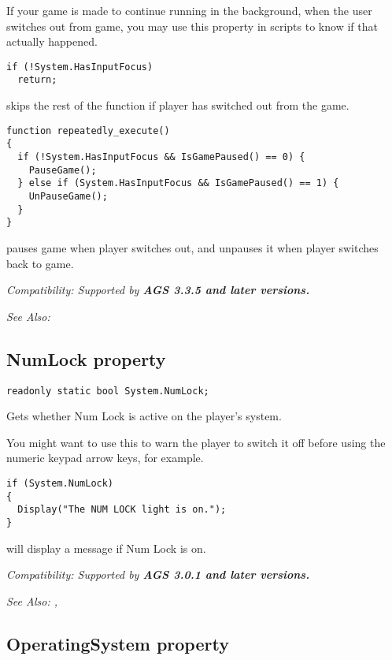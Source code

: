 If your game is made to continue running in the background, when the user switches out from game, you may use this property in scripts to know if that actually happened.

\begin{verbatim}
if (!System.HasInputFocus)
  return;
\end{verbatim}
skips the rest of the function if player has switched out from the game.

\begin{verbatim}
function repeatedly_execute()
{
  if (!System.HasInputFocus && IsGamePaused() == 0) {
    PauseGame();
  } else if (System.HasInputFocus && IsGamePaused() == 1) {
    UnPauseGame();
  }
}
\end{verbatim}
pauses game when player switches out, and unpauses it when player switches back to game.

\it{Compatibility:} Supported by \bf{AGS 3.3.5} and later versions.

\it{See Also:} 


\subsection{NumLock property}\label{System.NumLock}%

\begin{verbatim}
readonly static bool System.NumLock;
\end{verbatim}
Gets whether Num Lock is active on the player's system.

You might want to use this to warn the player to switch it off before using
the numeric keypad arrow keys, for example.

\begin{verbatim}
if (System.NumLock)
{
  Display("The NUM LOCK light is on.");
}
\end{verbatim}
will display a message if Num Lock is on.

\it{Compatibility:} Supported by \bf{AGS 3.0.1} and later versions.

\it{See Also:} ,


\subsection{OperatingSystem property}\label{System.OperatingSystem}%

